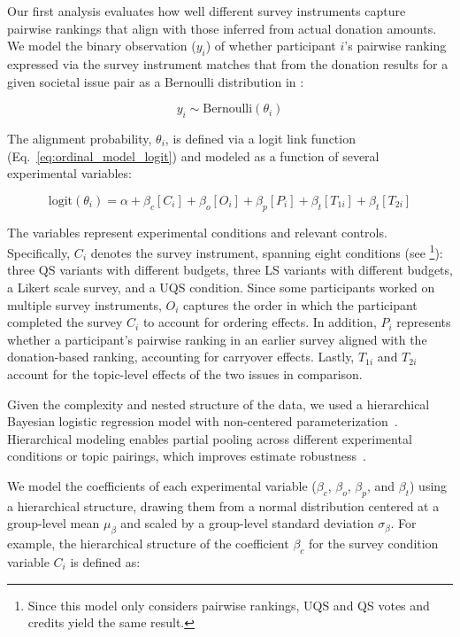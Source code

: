 Our first analysis evaluates how well different survey instruments capture pairwise rankings that align with those inferred from actual donation amounts. We model the binary observation ($y_i$) of whether participant $i$'s pairwise ranking expressed via the survey instrument matches that from the donation results for a given societal issue pair as a Bernoulli distribution in :

\begin{equation}
    \label{eq:ordinal_model_overall}
    y_i \sim \text{Bernoulli}(\theta_i)
\end{equation}

The alignment probability, $\theta_i$, is defined via a logit link function (Eq.~\ref{eq:ordinal_model_logit}) and modeled as a function of several experimental variables:

\begin{equation}
    \label{eq:ordinal_model_logit}
    \text{logit}(\theta_i) = \alpha + \beta_c[C_i] + \beta_o[O_i] + \beta_p[P_i] + \beta_t[T_{1i}] + \beta_t[T_{2i}]
\end{equation}

The variables represent experimental conditions and relevant controls. Specifically, $C_i$ denotes the survey instrument, spanning eight conditions (see \footnote{Since this model only considers pairwise rankings, UQS and QS votes and credits yield the same result.}): three QS variants with different budgets, three LS variants with different budgets, a Likert scale survey, and a UQS condition. Since some participants worked on multiple survey instruments, $O_i$ captures the order in which the participant completed the survey $C_i$ to account for ordering effects. In addition, $P_i$ represents whether a participant’s pairwise ranking in an earlier survey aligned with the donation-based ranking, accounting for carryover effects. Lastly, $T_{1i}$ and $T_{2i}$ account for the topic-level effects of the two issues in comparison.

Given the complexity and nested structure of the data, we used a hierarchical Bayesian logistic regression model with non-centered parameterization~\cite{mcelreath2018statistical}. Hierarchical modeling enables partial pooling across different experimental conditions or topic pairings, which improves estimate robustness~\cite{mcelreath2018statistical}. 

We model the coefficients of each experimental variable ($\beta_{c}$, $\beta_{o}$, $\beta_{p}$, and $\beta_{t}$) using a hierarchical structure, drawing them from a normal distribution centered at a group-level mean $\mu_{\beta}$ and scaled by a group-level standard deviation $\sigma_{\beta}$. For example, the hierarchical structure of the coefficient $\beta_c$ for the survey condition variable $C_i$ is defined as: 

